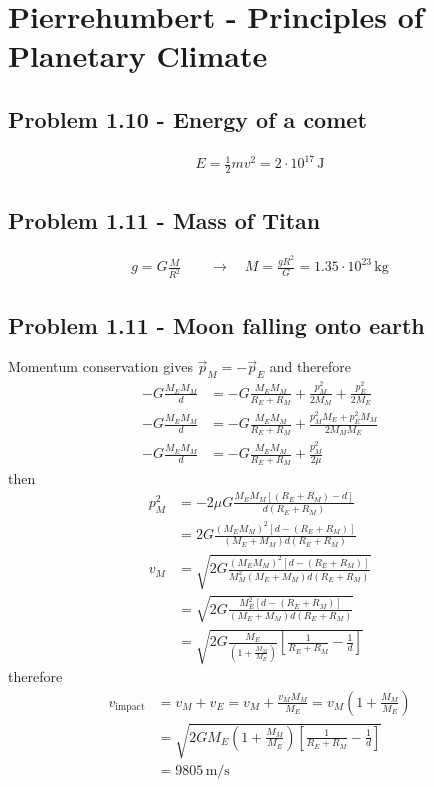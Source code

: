 \documentclass[../main.tex]{subfiles}
\begin{document}
\newpage
\section{{\sc Pierrehumbert} - Principles of Planetary Climate}
\subsection{Problem 1.10 - Energy of a comet}
\begin{align}
E=\frac{1}{2}mv^2=2\cdot 10^{17}\,\text{J}
\end{align}

\subsection{Problem 1.11 - Mass of Titan}
\begin{align}
g=G\frac{M}{R^2}\qquad\rightarrow\quad M=\frac{gR^2}{G}=1.35\cdot10^{23}\,\text{kg}
\end{align}

\subsection{Problem 1.11 - Moon falling onto earth}
Momentum conservation gives $\vec{p}_M=-\vec{p}_E$ and therefore
\begin{align}
-G\frac{M_EM_M}{d}&=-G\frac{M_EM_M}{R_E+R_M}+\frac{p_M^2}{2M_M}+\frac{p_E^2}{2M_E}\\
-G\frac{M_EM_M}{d}&=-G\frac{M_EM_M}{R_E+R_M}+\frac{p_M^2M_E+p_E^2M_M}{2M_MM_E}\\
-G\frac{M_EM_M}{d}&=-G\frac{M_EM_M}{R_E+R_M}+\frac{p_M^2}{2\mu}
\end{align}
then
\begin{align}
p_M^2&=-2\mu G\frac{M_EM_M\left[(R_E+R_M)-d\right]}{d(R_E+R_M)}\\
&=2 G\frac{(M_EM_M)^2\left[d-(R_E+R_M)\right]}{(M_E+M_M)d(R_E+R_M)}\\
v_M&=\sqrt{2 G\frac{(M_EM_M)^2\left[d-(R_E+R_M)\right]}{M_M^2(M_E+M_M)d(R_E+R_M)}}\\
&=\sqrt{2 G\frac{M_E^2\left[d-(R_E+R_M)\right]}{(M_E+M_M)d(R_E+R_M)}}\\
&=\sqrt{2 G\frac{M_E}{(1+\frac{M_M}{M_E})}\left[\frac{1}{R_E+R_M}-\frac{1}{d}\right]}
\end{align}
therefore 
\begin{align}
v_\text{impact}
&=v_M+v_E=v_M+\frac{v_MM_M}{M_E}=v_M\left(1+\frac{M_M}{M_E}\right)\\
&=\sqrt{2 GM_E\left(1+\frac{M_M}{M_E}\right)\left[\frac{1}{R_E+R_M}-\frac{1}{d}\right]}\\
&=9805\,\text{m/s}
\end{align}
\end{document}
